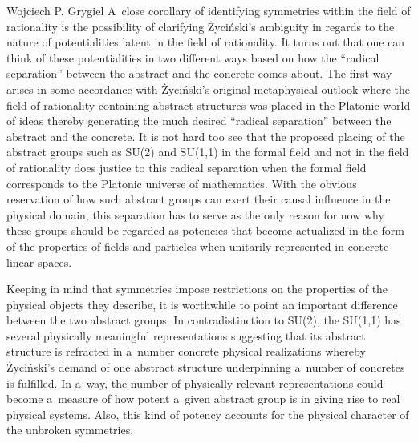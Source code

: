 \begin{artengenv}{Wojciech P. Grygiel}
A~close corollary of identifying symmetries within the field of rationality is the possibility of clarifying Życiński's ambiguity in regards to the nature of potentialities latent in the field of rationality. It turns out that one can think of these potentialities in two different ways based on how the ``radical separation'' between the abstract and the concrete comes about. The first way arises in some accordance with Życiński's original metaphysical outlook where the field of rationality containing abstract structures was placed in the Platonic world of ideas thereby generating the much desired ``radical separation'' between the abstract and the concrete. It is not hard too see that the proposed placing of the abstract groups such as SU(2) and SU(1,1) in the formal field and not in the field of rationality does justice to this radical separation when the formal field corresponds to the Platonic universe of mathematics. With the obvious reservation of how such abstract groups can exert their causal influence in the physical domain, this separation has to serve as the only reason for now why these groups should be regarded as potencies that become actualized in the form of the properties of fields and particles when unitarily represented in concrete linear spaces.



Keeping in mind that symmetries impose restrictions on the properties of the physical objects they describe, it is worthwhile to point an important difference between the two abstract groups. In contradistinction to SU(2), the SU(1,1) has several physically meaningful representations suggesting that its abstract structure is refracted in a~number concrete physical realizations whereby Życiński's demand of one abstract structure underpinning a~number of concretes is fulfilled. In a~way, the number of physically relevant representations could become a~measure of how potent a~given abstract group is in giving rise to real physical systems. Also, this kind of potency accounts for the physical character of the unbroken symmetries.




\end{artengenv}

